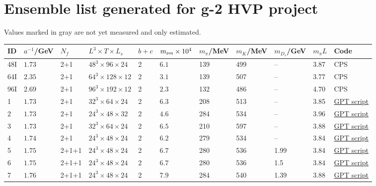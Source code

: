 \documentclass[landscape]{article}
\newcommand{\gr}[1]{{\color{gray} #1}}
\begin{document}
\section{Ensemble list generated for g-2 HVP project}

Values marked in gray are not yet measured and only estimated.

\begin{center}

\begin{tabular}{l|lllllllll|l}
  ID & $a^{-1}$/GeV & $N_f$ & $L^3 \times T \times L_s$ & $b+c$ & $m_{\rm res} \times 10^4$ & $m_\pi$/MeV & $m_K$/MeV & $m_{D_s}$/GeV & $m_\pi L$ & Code \\\hline
  48I & $1.73$ & 2+1 & $48^3 \times 96 \times 24$ & 2 & $6.1$ & 139 & 499 & -- & 3.87 & CPS\\
  64I & $2.35$ & 2+1 & $64^3 \times 128 \times 12$ & 2 & $3.1$ & 139 & 507 & -- & 3.77 & CPS\\
  96I & $2.69$ & 2+1 & $96^3 \times 192 \times 12$ & 2 & $2.3$ & 132 & 486 & -- & 4.70 & CPS\\\hline
  1 & $1.73$ & 2+1 & $32^3 \times 64 \times 24$ & 2 & $6.3$ & 208 & 513 & -- & 3.85 & \href{https://github.com/lehner/gpt/tree/master/applications/hmc/dwf/ensemble1.py}{GPT script} \\
  2 & $1.73$ & 2+1 & $24^3 \times 48 \times 32$ & 2 & $4.6$ & 284 & 534 & -- & 3.96 & \href{https://github.com/lehner/gpt/tree/master/applications/hmc/dwf/ensemble2.py}{GPT script} \\
  3 & $1.73$ & 2+1 & $32^3 \times 64 \times 24$ & 2 & $6.5$ & 210 & 597 & -- & 3.88 & \href{https://github.com/lehner/gpt/tree/master/applications/hmc/dwf/ensemble3.py}{GPT script} \\
  4 & $1.74$ & 2+1 & $24^3 \times 48 \times 24$ & 2 & $6.2$ & 279 & 534 & -- & 3.84 & \href{https://github.com/lehner/gpt/tree/master/applications/hmc/dwf/ensemble4.py}{GPT script} \\
  5 & $1.75$ & 2+1+1 & $24^3 \times 48 \times 24$ & 2 & $6.7$ & 280 & 536 & 1.99 & 3.84 & \href{https://github.com/lehner/gpt/tree/master/applications/hmc/dwf/ensemble5.py}{GPT script} \\
  6 & \gr{$1.75$} & 2+1+1 & $24^3 \times 48 \times 24$ & 2 & \gr{$6.7$} & \gr{280} & \gr{536} & \gr{1.5} & \gr{3.84} & \href{https://github.com/lehner/gpt/tree/master/applications/hmc/dwf/ensemble6.py}{GPT script} \\
  7 & $1.76$ & 2+1+1 & $24^3 \times 48 \times 24$ & 2 & $7.9$ & 284 & 540 & 1.39 & 3.88 & \href{https://github.com/lehner/gpt/tree/master/applications/hmc/dwf/ensemble7.py}{GPT script} \\

\end{tabular}
\end{center}
\end{document}
